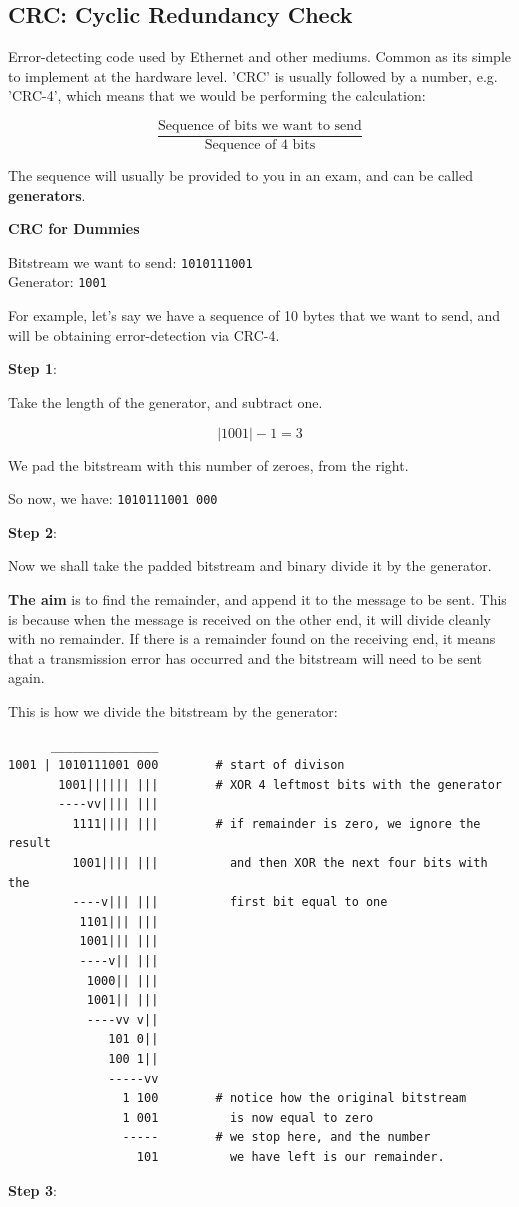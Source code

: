 \documentclass{article}
\begin{document}
\subsection{CRC: Cyclic Redundancy Check}

Error-detecting code used by Ethernet and other mediums. Common as its simple to implement at the hardware level. 'CRC' is usually followed by a number, e.g. 'CRC-4', which means that we would be performing the calculation:

\[
\frac{\text{Sequence of bits we want to send}}{\text{Sequence of 4 bits}}
\]

The sequence will usually be provided to you in an exam, and can be called \textbf{generators}.

\newpage
\large\textbf{CRC for Dummies}

Bitstream we want to send: \texttt{1010111001}\\
Generator: \texttt{1001}

For example, let's say we have a sequence of 10 bytes that we want to send, and will be obtaining error-detection via CRC-4.

\textbf{Step 1}:

Take the length of the generator, and subtract one.

\[ |1001| - 1  = 3\]

We pad the bitstream with this number of zeroes, from the right.

So now, we have: \texttt{1010111001 000}

\textbf{Step 2}:

Now we shall take the padded bitstream and binary divide it by the generator.

\textbf{The aim} is to find the remainder, and append it to the message to be sent. This is because when the message
is received on the other end, it will divide cleanly with no remainder. If there is a remainder found on the receiving end, it means that a transmission error has occurred and the bitstream will need to be sent again.

This is how we divide the bitstream by the generator:

\begin{lstlisting}
      _______________
1001 | 1010111001 000        # start of divison
       1001|||||| |||        # XOR 4 leftmost bits with the generator
       ----vv|||| |||         
         1111|||| |||        # if remainder is zero, we ignore the result
         1001|||| |||          and then XOR the next four bits with the 
         ----v||| |||          first bit equal to one
          1101||| |||
          1001||| |||
          ----v|| |||
           1000|| |||
           1001|| |||
           ----vv v||
              101 0||
              100 1||
              -----vv
                1 100        # notice how the original bitstream
                1 001          is now equal to zero
                -----        # we stop here, and the number 
                  101          we have left is our remainder.
\end{lstlisting}
\filbreak
\textbf{Step 3}:
\end{document}

